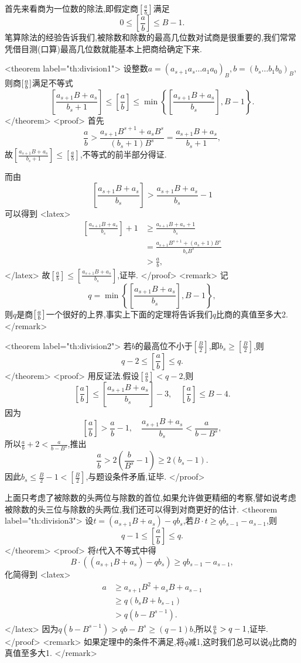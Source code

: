 首先来看商为一位数的除法,即假定商$\left[\frac{a}{b}\right]$满足$$0\le\left[\frac{a}{b}\right]\le B-1.$$笔算除法的经验告诉我们,被除数和除数的最高几位数对试商是很重要的,我们常常凭借目测(口算)最高几位数就能基本上把商给确定下来.

<theorem label="th:division1">
设整数$a=(a_{s+1}a_s\ldots a_1a_0)_B,b=(b_s\ldots b_1b_0)_B$,则商$[{a\over b}]$满足不等式
$$\left[\frac{a_{s+1}B+a_s}{b_s+1}\right]\le\left[\frac{a}{b}\right]\le\min\left\{\left[\frac{a_{s+1}B+a_s}{b_s}\right],B-1\right\}.$$
</theorem>
<proof>
首先$$\frac{a}{b}>\frac{a_{s+1}B^{s+1}+a_sB^s}{(b_s+1)B^s}=\frac{a_{s+1}B+a_s}{b_s+1},$$故$\left[\frac{a_{s+1}B+a_s}{b_s+1}\right] \le \left[\frac{a}{b}\right]$,不等式的前半部分得证.

而由$$\left[\frac{a_{s+1}B+a_s}{b_s}\right] > \frac{a_{s+1}B+a_s}{b_s}-1$$可以得到
<latex>
\begin{align*}
  \left[\frac{a_{s+1}B+a_s}{b_s}\right]+1&\ge\frac{a_{s+1}B+a_s+1}{b_s}\\
&=\frac{a_{s+1}B^{s+1}+(a_s+1)B^s}{b_sB^s}\\
&>\frac{a}{b},
\end{align*}
</latex>
故$\left[\frac{a}{b}\right]\le\left[\frac{a_{s+1}B+a_s}{b_s}\right]$,证毕.
</proof>
<remark>
记$$q = \min\left\{\left[\frac{a_{s+1}B+a_s}{b_s}\right],B-1\right\},$$则$q$是商$\left[{a\over b}\right]$一个很好的上界,事实上下面的定理将告诉我们$q$比商的真值至多大2.
</remark>

<theorem label="th:division2">
若$b$的最高位不小于$\left[\frac{B}{2}\right]$,即$b_s\ge\left[\frac{B}{2}\right]$,则$$q-2\le\left[\frac{a}{b}\right]\le q.$$
</theorem>
<proof>
用反证法.假设$\left[\frac{a}{b}\right]<q-2$,则$$\left[\frac{a}{b}\right]\le\left[\frac{a_{s+1}B+a_s}{b_s}\right]-3,\quad\left[\frac{a}{b}\right] \le B-4.$$
因为$$\left[\frac{a}{b}\right]>\frac{a}{b}-1,\quad\frac{a_{s+1}B+a_s}{b_s}<\frac{a}{b-B^s},$$所以$\frac{a}{b}+2<\frac{a}{b-B^s}$,推出$$\frac{a}{b}>2(\frac{b}{B^s}-1)\ge 2(b_s-1).$$因此$b_s \le \frac{B}{2}-1<\left[\frac{B}{2}\right]$,与题设条件矛盾,证毕.
</proof>

上面只考虑了被除数的头两位与除数的首位,如果允许做更精细的考察,譬如说考虑被除数的头三位与除数的头两位,我们还可以得到对商更好的估计.
<theorem label="th:division3">
设$t=(a_{s+1}B+a_s)-qb_s$,若$B\cdot t\ge qb_{s-1}-a_{s-1}$,则$$q-1\le\left[\frac{a}{b}\right]\le q.$$
</theorem>
<proof>
将$t$代入不等式中得$$B\cdot((a_{s+1}B+a_s)-qb_s)\ge qb_{s-1}-a_{s-1},$$化简得到
<latex>
\begin{align*}
a&\ge a_{s+1}B^2+a_sB+a_{s-1}\\
&\ge q(b_sB+b_{s-1})\\
&>q(b-B^{s-1}).
\end{align*}
</latex>
因为$q(b-B^{s-1})>qb-B^s\ge(q-1)b$,所以${a\over b}>q-1$,证毕.
</proof>
<remark>
如果定理中的条件不满足,将$q$减1,这时我们总可以说$q$比商的真值至多大1.
</remark>

